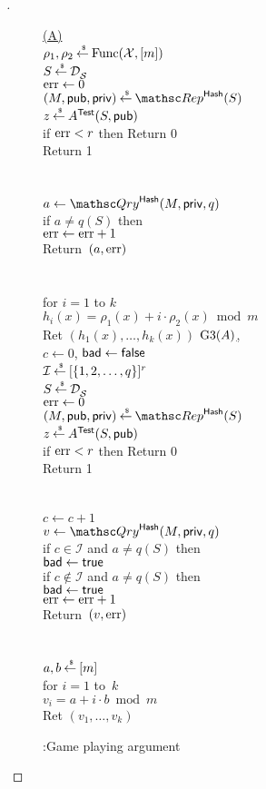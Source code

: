 \begin{proof}[]
\begin{figure}
{
{
\underline{(A)}\\
$\rho_1,\rho_2 {\:\stackrel{{\scriptscriptstyle \hspace{0.2em}\$}} {\leftarrow}\:} \mathrm{Func}({\cal X},[m])$\\
$S {\:\stackrel{{\scriptscriptstyle \hspace{0.2em}\$}} {\leftarrow}\:} \mathcal{D}_{{\cal S}}^{}$\\
$\mathrm{err} \gets 0$\\
$(M,\pubaux,\privaux) \getsr \Rep^{\HashOracle}(S)$\\
$z {\:\stackrel{{\scriptscriptstyle \hspace{0.2em}\$}} {\leftarrow}\:} A^{\mathsf{Test}}(S,{\sf pub})$\\
if $\mathrm{err}  < r$ then Return 0\\
Return 1\\\\
%
\\
$a \gets \Qry^{\HashOracle}(M,\privaux,q)$\\
if $a \neq q(S)$ then \\
\nudge $\mathrm{err} \gets\mathrm{err} +1$\\
Return~$(a,\mathrm{err} )$\\\\
%
\\
for $i=1$ to $k$\\
\nudge $h_i(x) = \rho_1(x)+i \cdot \rho_2(x) \bmod m$\\
Ret $\left(h_1(x),\ldots,h_k(x)\right)$
}
{
\underline{{$\text{G3}(A)$},}\\
$c\gets 0$, $\mathsf{bad} \gets \mathsf{false}$\\
$\mathcal{I}{\:\stackrel{{\scriptscriptstyle \hspace{0.2em}\$}} {\leftarrow}\:} [\{1,2,\ldots,q\}]^r$\\
$S {\:\stackrel{{\scriptscriptstyle \hspace{0.2em}\$}} {\leftarrow}\:} \mathcal{D}_{{\cal S}}^{}$\\
$\mathrm{err} \gets 0$\\
$(M,\pubaux,\privaux) \getsr \Rep^{\HashOracle}(S)$\\
$z {\:\stackrel{{\scriptscriptstyle \hspace{0.2em}\$}} {\leftarrow}\:} A^{\mathsf{Test}}(S,{\sf pub})$\\
if $\mathrm{err}  < r$ then Return 0\\
Return 1\\\\
%
\\
$c \gets c+1$\\
$v \gets \Qry^{\HashOracle}(M,\privaux,q)$\\
if $c \in \mathcal{I}$ and $a \neq q(S)$ then \\
\nudge $\mathsf{bad} \gets \mathsf{true}$ \\
if $c \not\in \mathcal{I}$ and $a \neq q(S)$ then \\
\nudge $\mathsf{bad} \gets \mathsf{true}$\\
\nudge $\mathrm{err} \gets\mathrm{err} +1$\\
Return~$(v,\mathrm{err} )$\\\\
%
\\
$a,b {\:\stackrel{{\scriptscriptstyle \hspace{0.2em}\$}} {\leftarrow}\:} [m]$\\
for $i = 1$ to~$k$\\
\nudge $v_i = a+i \cdot b \bmod m$\\
Ret $\left(v_1,\ldots,v_k\right)$
}
}
\caption{:Game playing argument}\label{fig:Game}
\end{figure}



\end{proof}
